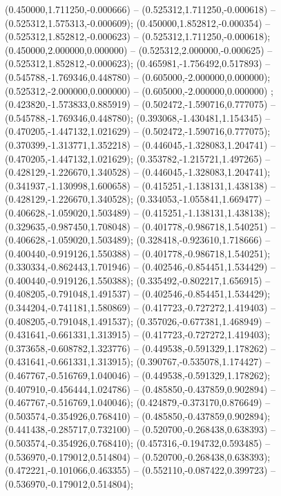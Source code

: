 (0.450000,1.711250,-0.000666) -- (0.525312,1.711250,-0.000618) -- (0.525312,1.575313,-0.000609);
 (0.450000,1.852812,-0.000354) -- (0.525312,1.852812,-0.000623) -- (0.525312,1.711250,-0.000618);
 (0.450000,2.000000,0.000000) -- (0.525312,2.000000,-0.000625) -- (0.525312,1.852812,-0.000623);
 (0.465981,-1.756492,0.517893) -- (0.545788,-1.769346,0.448780) -- (0.605000,-2.000000,0.000000);
 (0.525312,-2.000000,0.000000) -- (0.605000,-2.000000,0.000000) ;
 (0.423820,-1.573833,0.885919) -- (0.502472,-1.590716,0.777075) -- (0.545788,-1.769346,0.448780);
 (0.393068,-1.430481,1.154345) -- (0.470205,-1.447132,1.021629) -- (0.502472,-1.590716,0.777075);
 (0.370399,-1.313771,1.352218) -- (0.446045,-1.328083,1.204741) -- (0.470205,-1.447132,1.021629);
 (0.353782,-1.215721,1.497265) -- (0.428129,-1.226670,1.340528) -- (0.446045,-1.328083,1.204741);
 (0.341937,-1.130998,1.600658) -- (0.415251,-1.138131,1.438138) -- (0.428129,-1.226670,1.340528);
 (0.334053,-1.055841,1.669477) -- (0.406628,-1.059020,1.503489) -- (0.415251,-1.138131,1.438138);
 (0.329635,-0.987450,1.708048) -- (0.401778,-0.986718,1.540251) -- (0.406628,-1.059020,1.503489);
 (0.328418,-0.923610,1.718666) -- (0.400440,-0.919126,1.550388) -- (0.401778,-0.986718,1.540251);
 (0.330334,-0.862443,1.701946) -- (0.402546,-0.854451,1.534429) -- (0.400440,-0.919126,1.550388);
 (0.335492,-0.802217,1.656915) -- (0.408205,-0.791048,1.491537) -- (0.402546,-0.854451,1.534429);
 (0.344204,-0.741181,1.580869) -- (0.417723,-0.727272,1.419403) -- (0.408205,-0.791048,1.491537);
 (0.357026,-0.677381,1.468949) -- (0.431641,-0.661331,1.313915) -- (0.417723,-0.727272,1.419403);
 (0.373658,-0.608782,1.323776) -- (0.449538,-0.591329,1.178262) -- (0.431641,-0.661331,1.313915);
 (0.390767,-0.535078,1.174427) -- (0.467767,-0.516769,1.040046) -- (0.449538,-0.591329,1.178262);
 (0.407910,-0.456444,1.024786) -- (0.485850,-0.437859,0.902894) -- (0.467767,-0.516769,1.040046);
 (0.424879,-0.373170,0.876649) -- (0.503574,-0.354926,0.768410) -- (0.485850,-0.437859,0.902894);
 (0.441438,-0.285717,0.732100) -- (0.520700,-0.268438,0.638393) -- (0.503574,-0.354926,0.768410);
 (0.457316,-0.194732,0.593485) -- (0.536970,-0.179012,0.514804) -- (0.520700,-0.268438,0.638393);
 (0.472221,-0.101066,0.463355) -- (0.552110,-0.087422,0.399723) -- (0.536970,-0.179012,0.514804);
